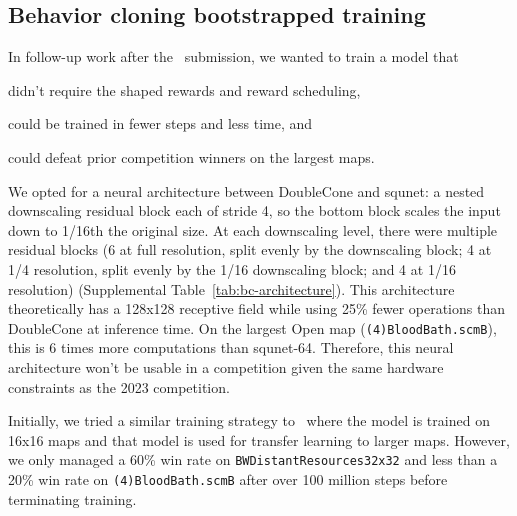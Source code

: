 \documentclass[conference]{IEEEtran}
\begin{document}
\subsection{Behavior cloning bootstrapped training}
In follow-up work after the \agentName\ submission, we wanted to train a model that
\begin{inparaenum}[(1)]
    \item didn't require the shaped rewards and reward scheduling,
    \item could be trained in fewer steps and less time, and
    \item could defeat prior competition winners on the largest maps.
\end{inparaenum}
We opted for a neural architecture between DoubleCone and squnet: a nested downscaling residual
block each of stride 4, so the bottom block scales the input down to 1/16th the original
size. At each downscaling level, there were multiple residual blocks (6 at full
resolution, split evenly by the downscaling block; 4 at 1/4 resolution, split evenly by
the 1/16 downscaling block; and 4 at 1/16 resolution) (Supplemental Table~\ref{tab:bc-architecture}). This architecture theoretically
has a 128x128 receptive field while using 25\% fewer operations than DoubleCone at inference time. On
the largest Open map (\texttt{(4)BloodBath.scmB}), this is 6 times more
computations than squnet-64. Therefore, this neural architecture won't be usable in a
competition given the same hardware constraints as the 2023 competition.

Initially, we tried a similar training strategy to \agentName\ where the model is
trained on 16x16 maps and that model is used for transfer learning to
larger maps. However, we only managed a 60\% win rate on
\texttt{BWDistantResources32x32} and less than a 20\% win rate on
\texttt{(4)BloodBath.scmB} after over 100 million
steps before terminating training.
\end{document}
